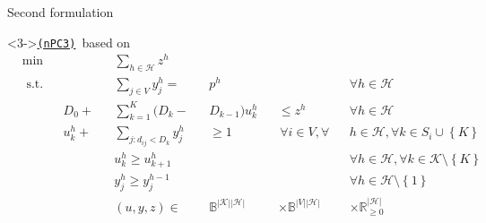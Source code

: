 \documentclass[utf8,aspectratio=1610,ngerman,english]{beamer}
\newcommand{\nPCE}{\hyperref[eq:nPCE]{\texttt{(nPC3)}}\xspace}
\newcommand{\inH}{h \in \mathcal H}
\begin{document}
\begin{frame}{Second formulation}
\begin{minipage}[t]{0.59\linewidth}
        \begin{block}<3->{\nPCE\ based on \cite{Elloumi2018}}
            \vspace*{-20pt}
            \begin{subequations}\label{eq:nPCE}
                \begin{alignat*}{9}
                     & \min         &  &           &  & \sum_{\inH}z^{h}            &  &                                      &  &                                    &  &                                                                                    \\
                     & \text{ s.t.} &  &           &  & \sum_{j \in V}y_{j}^h =     &  & p^{h}                                &  &                                    &  & \forall \inH                                                                       \\
                     &              &  & D_0 +     &  & \sum_{k=1}^{K} (D_k-        &  & D_{k-1})u^{h}_k                      &  & \leq z^h \;                        &  & \forall h \in \mathcal{H}                                                          \\
                     &              &  & u^{h}_k + &  & \sum_{j:d_{ij}<D_k} y_{j}^h &  & \geq 1                               &  & \,\forall i \in V,\forall          &  & h \in \mathcal H, \forall k \in S_i \cup \left \{K \right \}                       \\
                     &              &  &           &  & u^{h}_k \geq u_{k+1}^h      &  &                                      &  &                                    &  & \forall h \in \mathcal{H}, \forall k \in \mathcal{K} \setminus \left \{K \right \} \\
                     &              &  &           &  & y_{j}^h \geq y_j^{h-1}      &  &                                      &  &                                    &  & \forall \inH \setminus \left \{1 \right \}                                         \\
                     &              &  &           &  & (u,y,z)  \in                &  & \mathbb B^{|\mathcal K||\mathcal H|} &  & \times \mathbb B^{|V||\mathcal H|} &  & \times \mathbb{R}_{\geq 0}^{|\mathcal H|}
                \end{alignat*}
            \end{subequations}
        \end{block}
    \end{minipage}
\end{frame}
\end{document}
